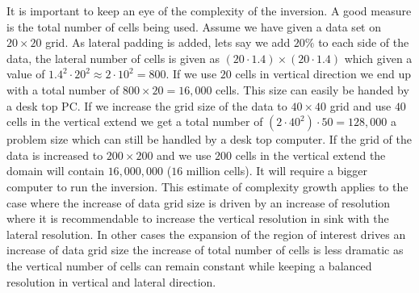It is important to keep an eye of the complexity of the inversion. A good measure is the total number of cells 
being used. Assume we have given a data set on $20 \times 20$ grid. As lateral padding is added, lets say 
we add $20 \%$ to each side of the data, the lateral number of cells is given as $(20 \cdot 1.4) \times (20 \cdot 1.4)$
which given a value of $1.4^2 \cdot 20^2 \approx 2 \cdot 10^2 = 800$. If we use $20$ cells in vertical direction
we end up with a total number of $800 \times 20 = 16,000$ cells. This size can easily be handed by a desk top PC.
If we increase the grid size of the data to $40 \times 40$ grid and
use $40$ cells in the vertical extend we get a total number of $( 2 \cdot 40^2) \cdot 50 =128,000$ a problem size
which can still be handled by a desk top computer. If the grid of the data is increased 
to $200 \times 200$ and we use $200$ cells in the vertical extend the domain will contain $16,000,000$ ($16$ million cells). 
It will require a bigger computer to run the inversion. This estimate of complexity growth applies to the case where the increase 
of data grid size is driven by an increase of resolution where it is recommendable to increase the 
vertical resolution in sink with the lateral resolution. In other cases the expansion of the region of
interest drives an increase of data grid size the increase of total number of cells is less dramatic as
the vertical number of cells can remain constant while keeping a balanced resolution in vertical and lateral direction.


